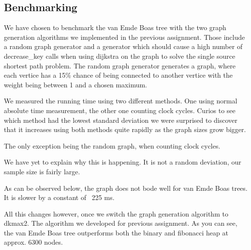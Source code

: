 \subsection*{Benchmarking}
We have chosen to benchmark the van Emde Boas tree with the two graph generation algorithms we implemented in the previous assignment.
Those include a random graph generator and a generator which should cause a high number of decrease\_key calls when using dijkstra on the graph to solve the single source shortest path problem.
The random graph generator generates a graph, where each vertice has a 15\% chance of being connected to another vertice with the weight being between 1 and a chosen maximum.

We measured the running time using two different methods. One using normal absolute time measurement, the other one counting clock cycles. Curios to see which method had the lowest standard deviation we were surprised to discover that it increases using both methods quite rapidly as the graph sizes grow bigger.\newline


The only exception being the random graph, when counting clock cycles.\newline


We have yet to explain why this is happening. It is not a random deviation, our sample size is fairly large.\newline


As can be observed below, the graph does not bode well for van Emde Boas trees. It is slower by a constant of ~225 ms.\newline


All this changes however, once we switch the graph generation algorithm to dkmax2. The algorithm we developed for previous assignment. As you can see, the van Emde Boas tree outperforms both the binary and fibonacci heap at approx. 6300 nodes.\newline

